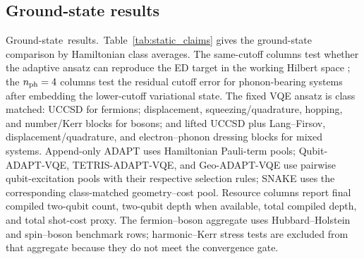 \documentclass[
  reprint,
  amsmath,
  amssymb,
  aps,
  pra,
  nofootinbib,
  superscriptaddress,
  floatfix
]{revtex4-2}
\newcommand{\tentative}[1]{\textcolor{red!70!black}{#1}}
\newcommand{\structlabel}[1]{\noindent\mbox{\tentative{#1.}}~}
\begin{document}
\subsection{Ground-state results}

\structlabel{Ground-state results}Table~\ref{tab:static_claims} gives the ground-state comparison by Hamiltonian class averages. The same-cutoff columns test whether the adaptive ansatz can reproduce the ED target in the working Hilbert space \cite{Weisse2008}; the $n_{\rm ph}=4$ columns test the residual cutoff error for phonon-bearing systems after embedding the lower-cutoff variational state. The fixed VQE ansatz is class matched: UCCSD for fermions; displacement, squeezing/quadrature, hopping, and number/Kerr blocks for bosons; and lifted UCCSD plus Lang--Firsov, displacement/quadrature, and electron--phonon dressing blocks for mixed systems. Append-only ADAPT uses Hamiltonian Pauli-term pools; Qubit-ADAPT-VQE, TETRIS-ADAPT-VQE, and Geo-ADAPT-VQE use pairwise qubit-excitation pools with their respective selection rules; SNAKE uses the corresponding class-matched geometry--cost pool. Resource columns report final compiled two-qubit count, two-qubit depth when available, total compiled depth, and total shot-cost proxy. The fermion--boson aggregate uses Hubbard--Holstein and spin--boson benchmark rows; harmonic--Kerr stress tests are excluded from that aggregate because they do not meet the convergence gate.
\end{document}
